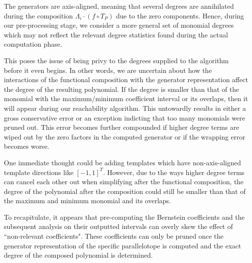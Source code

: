 The generators are axis-aligned, meaning that several degrees are annihilated during the composition $\Lambda_i\cdot (f\circ T_P)$ due to the zero components.
%
Hence, during our pre-processing stage, we consider a more general set of monomial degrees which may not reflect the relevant degree statistics found during the actual computation phase.

This poses the issue of being privy to the degrees supplied to the algorithm before it even begins.
%
In other words, we are uncertain about how the interactions of the functional composition with the generator representation affect the degree of the resulting polynomial. If the degree is smaller than that of the monomial with the maximum/minimum coefficient interval or its overlaps, then it will appear during our reachability algorithm. This untowardly results in either a gross conservative error or an exception indicting that too many monomials were pruned out.
%
This error becomes further compounded if higher degree terms are wiped out by the zero factors in the computed generator or if the wrapping error becomes worse.

One immediate thought could be adding templates which have non-axis-aligned template directions like $[-1,1]^T$. However, due to the ways higher degree terms can cancel each other out when simplifying after the functional composition, the degree of the polynomial after the composition could still be smaller than that of the maximum and minimum monomial and its overlaps.

To recapitulate, it appears that pre-computing the Bernstein coefficients and the subsequent analysis on their outputted intervals can overly skew the effect of ``non-relevant coefficients". These coefficients can only be pruned once the generator representation of the specific parallelotope is computed and the exact degree of the composed polynomial is determined.


